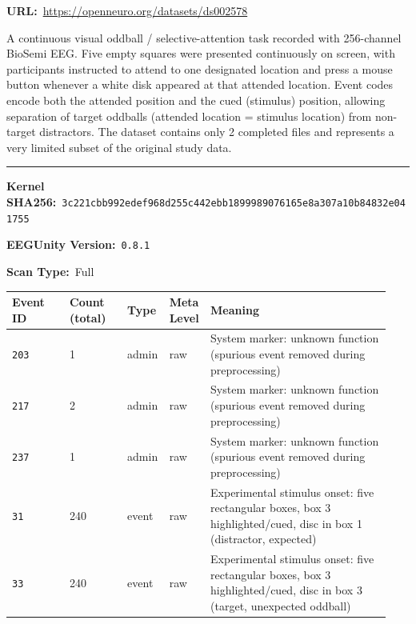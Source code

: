 {\begin{tcolorbox}
\par{\footnotesize\textbf{URL:}~\url{https://openneuro.org/datasets/ds002578}}
\tcbline
{}\par\smallskip
{\footnotesize A continuous visual oddball / selective-attention task recorded with 256-channel BioSemi EEG. Five empty squares were presented continuously on screen, with participants instructed to attend to one designated location and press a mouse button whenever a white disk appeared at that attended location. Event codes encode both the attended position and the cued (stimulus) position, allowing separation of target oddballs (attended location = stimulus location) from non-target distractors. The dataset contains only 2 completed files and represents a very limited subset of the original study data.}
\noindent\rule{\linewidth}{0.4pt}\par\nopagebreak
{}\par\smallskip
{\scriptsize
\noindent\textbf{Kernel SHA256:}~\texttt{3c221cbb992edef968d255c442ebb1899989076165e8a307a10b84832e041755}\par\smallskip
\noindent\textbf{EEGUnity Version:}~\texttt{0.8.1}\par\smallskip
\noindent\textbf{Scan Type:}~Full\par\smallskip
}
\smallskip{}\par\smallskip
\begingroup\scriptsize\setlength{\tabcolsep}{2pt}
\begin{tabular}{@{}p{0.1567\linewidth}p{0.1567\linewidth}p{0.0783\linewidth}p{0.0783\linewidth}p{0.4700\linewidth}@{}}
\toprule
\textbf{Event ID} & \textbf{Count (total)} & \textbf{Type} & \textbf{Meta Level} & \textbf{Meaning} \\
\midrule
\texttt{203} & 1 & admin & raw & System marker: unknown function (spurious event removed during preprocessing) \\
\texttt{217} & 2 & admin & raw & System marker: unknown function (spurious event removed during preprocessing) \\
\texttt{237} & 1 & admin & raw & System marker: unknown function (spurious event removed during preprocessing) \\
\texttt{31} & 240 & event & raw & Experimental stimulus onset: five rectangular boxes, box 3 highlighted/cued, disc in box 1 (distractor, expected) \\
\texttt{33} & 240 & event & raw & Experimental stimulus onset: five rectangular boxes, box 3 highlighted/cued, disc in box 3 (target, unexpected oddball) \\

\end{tabular}
\end{tcolorbox}}
